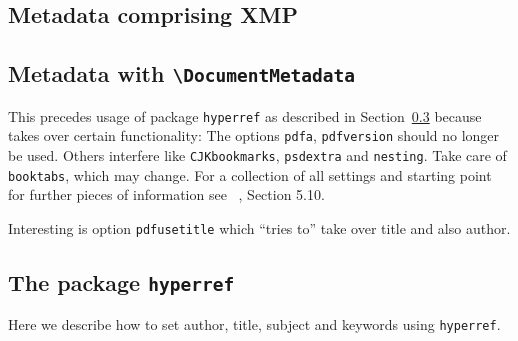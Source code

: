 \documentclass[a4paper, USenglish]{article}%
\makeatletter
\newcommand{\cmd}[2][]{\texttt{\textbackslash{}#2#1}}
\newcommand{\pkg}[1]{\texttt{#1}}%
\newcommand{\cmd}[2][]{\texttt{\textbackslash{}#2#1}\sindex[cmd]{#2@\texttt{\textbackslash{}#2}}}%
\newcommand{\pkg}[2][]{\texorpdfstring{\texttt{#2}\sindex[pkg]{#2@\texttt{#2}}}{xxx}} %
\makeatother
\begin{document}
\subsection{Metadata comprising XMP}\label{subsec:meta}



\subsection{Metadata with \texorpdfstring{\cmd{DocumentMetadata}}{DocumentMetadata}}\label{subsec:docMeta}

This precedes usage of package \pkg{hyperref} as described in Section~\ref{subsec:hyperref} because takes over certain functionality: 
The options \texttt{pdfa}, \texttt{pdfversion} should no longer be used. 
Others interfere like \texttt{CJKbookmarks}, \texttt{psdextra} and \texttt{nesting}. 
Take care of \texttt{booktabs}, which may change. 
For a collection of all settings and starting point for further pieces of information see~ \cite{HyperTextP}, Section 5.10. 

Interesting is option \texttt{pdfusetitle} which ``tries to'' take over title and also author. 





\subsection{The package \texorpdfstring{\pkg{hyperref}}{hyperref}}\label{subsec:hyperref}

Here we describe how to set author, title, subject and keywords using \texttt{hyperref}. 

\end{document}
